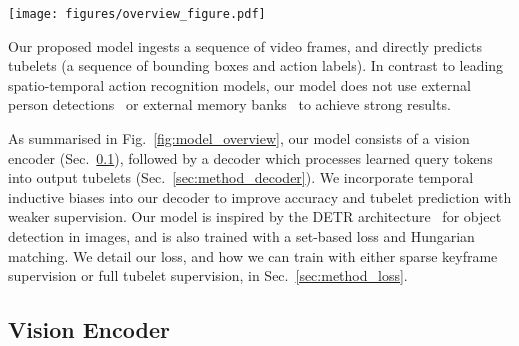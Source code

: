 \documentclass[10pt,twocolumn,letterpaper]{article}
\begin{document}
\begin{figure*}[t]
	\vspace{-1.5\baselineskip}
	\texttt{[image: figures/overview\_figure.pdf]}
	\caption{
	Our model processes a fixed-length video clip, and for each frame, outputs tubelets (\ie linked bounding boxes with associated action class probabilities).
	It consists of a transformer-based vision encoder which outputs a video representation, $\mathbf{x} \in \mathbb{R}^{T \times h \times w \times d}$.
	The video representation, along with learned queries, $\mathbf{q}$ (which are factorised into spatial $\mathbf{q}^s$ and temporal components $\mathbf{q}^t$) are decoded into tubelets by a decoder of $L$ layers followed by shallow box and class prediction heads.
	}
 	\vspace{-\baselineskip}
	\label{fig:model_overview}
\end{figure*} 
Our proposed model ingests a sequence of video frames, and directly predicts tubelets (a sequence of bounding boxes and action labels). In contrast to leading spatio-temporal action recognition models, our model does not use external person detections~\cite{pan2021actor, arnab2022beyond, tong2022videomae, wu2022memvit} or external memory banks~\cite{wu_cvpr_2019, zhao2022tuber, pan2021actor} to achieve strong results.

As summarised in Fig.~\ref{fig:model_overview}, our model consists of a vision encoder (Sec.~\ref{sec:method_vision_encoder}), followed by a decoder which processes learned query tokens into output tubelets (Sec.~\ref{sec:method_decoder}).
We incorporate temporal inductive biases into our decoder to improve accuracy and tubelet prediction with weaker supervision. Our model is inspired by the DETR architecture~\cite{carion_eccv_2020} for object detection in images, and is also trained with a set-based loss and Hungarian matching.
We detail our loss, and how we can train with either sparse keyframe supervision or full tubelet supervision, in Sec.~\ref{sec:method_loss}.




\subsection{Vision Encoder}
\label{sec:method_vision_encoder}
\end{document}
